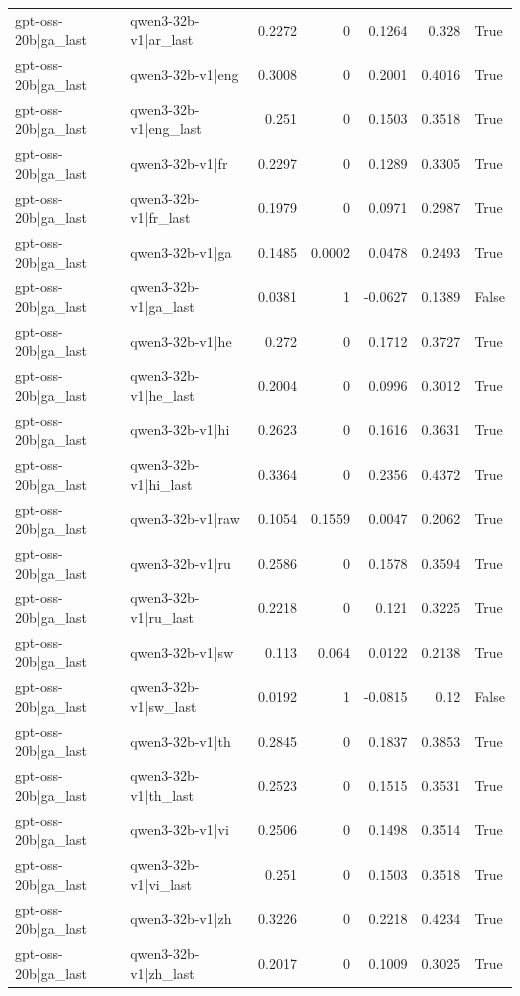 \begin{table}
\begin{tabular}{l l r r r r l}
gpt-oss-20b|ga_last & qwen3-32b-v1|ar_last & 0.2272 & 0 & 0.1264 & 0.328 & True \\
gpt-oss-20b|ga_last & qwen3-32b-v1|eng & 0.3008 & 0 & 0.2001 & 0.4016 & True \\
gpt-oss-20b|ga_last & qwen3-32b-v1|eng_last & 0.251 & 0 & 0.1503 & 0.3518 & True \\
gpt-oss-20b|ga_last & qwen3-32b-v1|fr & 0.2297 & 0 & 0.1289 & 0.3305 & True \\
gpt-oss-20b|ga_last & qwen3-32b-v1|fr_last & 0.1979 & 0 & 0.0971 & 0.2987 & True \\
gpt-oss-20b|ga_last & qwen3-32b-v1|ga & 0.1485 & 0.0002 & 0.0478 & 0.2493 & True \\
gpt-oss-20b|ga_last & qwen3-32b-v1|ga_last & 0.0381 & 1 & -0.0627 & 0.1389 & False \\
gpt-oss-20b|ga_last & qwen3-32b-v1|he & 0.272 & 0 & 0.1712 & 0.3727 & True \\
gpt-oss-20b|ga_last & qwen3-32b-v1|he_last & 0.2004 & 0 & 0.0996 & 0.3012 & True \\
gpt-oss-20b|ga_last & qwen3-32b-v1|hi & 0.2623 & 0 & 0.1616 & 0.3631 & True \\
gpt-oss-20b|ga_last & qwen3-32b-v1|hi_last & 0.3364 & 0 & 0.2356 & 0.4372 & True \\
gpt-oss-20b|ga_last & qwen3-32b-v1|raw & 0.1054 & 0.1559 & 0.0047 & 0.2062 & True \\
gpt-oss-20b|ga_last & qwen3-32b-v1|ru & 0.2586 & 0 & 0.1578 & 0.3594 & True \\
gpt-oss-20b|ga_last & qwen3-32b-v1|ru_last & 0.2218 & 0 & 0.121 & 0.3225 & True \\
gpt-oss-20b|ga_last & qwen3-32b-v1|sw & 0.113 & 0.064 & 0.0122 & 0.2138 & True \\
gpt-oss-20b|ga_last & qwen3-32b-v1|sw_last & 0.0192 & 1 & -0.0815 & 0.12 & False \\
gpt-oss-20b|ga_last & qwen3-32b-v1|th & 0.2845 & 0 & 0.1837 & 0.3853 & True \\
gpt-oss-20b|ga_last & qwen3-32b-v1|th_last & 0.2523 & 0 & 0.1515 & 0.3531 & True \\
gpt-oss-20b|ga_last & qwen3-32b-v1|vi & 0.2506 & 0 & 0.1498 & 0.3514 & True \\
gpt-oss-20b|ga_last & qwen3-32b-v1|vi_last & 0.251 & 0 & 0.1503 & 0.3518 & True \\
gpt-oss-20b|ga_last & qwen3-32b-v1|zh & 0.3226 & 0 & 0.2218 & 0.4234 & True \\
gpt-oss-20b|ga_last & qwen3-32b-v1|zh_last & 0.2017 & 0 & 0.1009 & 0.3025 & True \\

\end{tabular}
\end{table}
